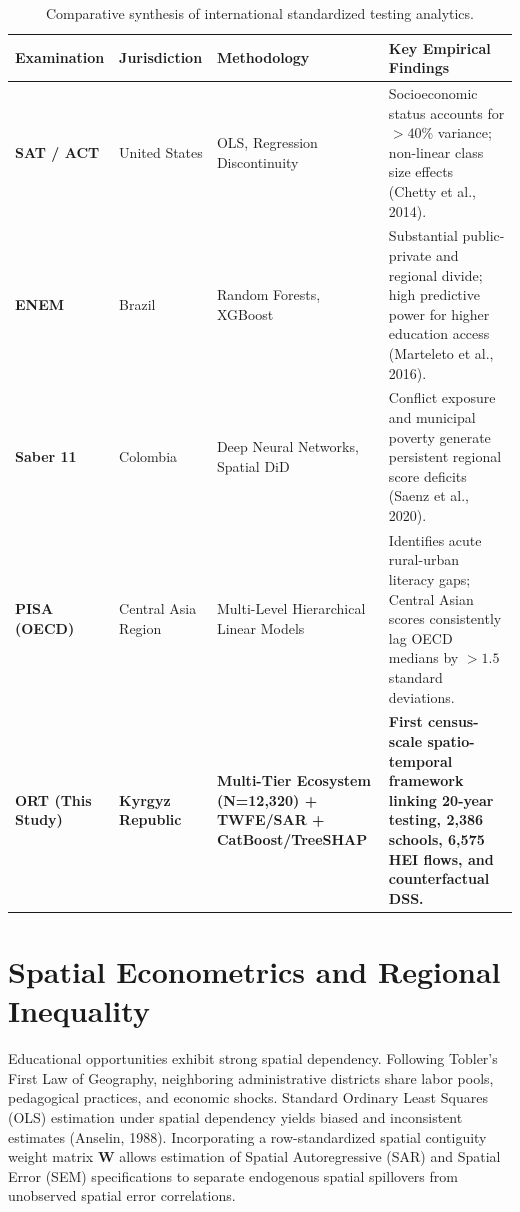 \documentclass[12pt,letterpaper]{report}
\begin{document}
\begin{table}[htbp]
\centering
\begin{singlespace}
\small
\caption{Comparative synthesis of international standardized testing analytics.}
\label{tab:comparison_lit}
\begin{tabularx}{\textwidth}{l p{2.6cm} p{3.2cm} X}
\toprule
\textbf{Examination} & \textbf{Jurisdiction} & \textbf{Methodology} & \textbf{Key Empirical Findings} \\
\midrule
\textbf{SAT / ACT} & United States & OLS, Regression Discontinuity & Socioeconomic status accounts for $>40\%$ variance; non-linear class size effects (Chetty et al., 2014). \\
\textbf{ENEM} & Brazil & Random Forests, XGBoost & Substantial public-private and regional divide; high predictive power for higher education access (Marteleto et al., 2016). \\
\textbf{Saber 11} & Colombia & Deep Neural Networks, Spatial DiD & Conflict exposure and municipal poverty generate persistent regional score deficits (Saenz et al., 2020). \\
\textbf{PISA (OECD)} & Central Asia Region & Multi-Level Hierarchical Linear Models & Identifies acute rural-urban literacy gaps; Central Asian scores consistently lag OECD medians by $>1.5$ standard deviations. \\
\midrule
\textbf{ORT (This Study)} & \textbf{Kyrgyz Republic} & \textbf{Multi-Tier Ecosystem (N=12,320) + TWFE/SAR + CatBoost/TreeSHAP} & \textbf{First census-scale spatio-temporal framework linking 20-year testing, 2,386 schools, 6,575 HEI flows, and counterfactual DSS.} \\
\bottomrule
\end{tabularx}
\end{singlespace}
\end{table}

\section{Spatial Econometrics and Regional Inequality}
Educational opportunities exhibit strong spatial dependency. Following Tobler's First Law of Geography, neighboring administrative districts share labor pools, pedagogical practices, and economic shocks. Standard Ordinary Least Squares (OLS) estimation under spatial dependency yields biased and inconsistent estimates (Anselin, 1988). Incorporating a row-standardized spatial contiguity weight matrix $\mathbf{W}$ allows estimation of Spatial Autoregressive (SAR) and Spatial Error (SEM) specifications to separate endogenous spatial spillovers from unobserved spatial error correlations.
\end{document}
